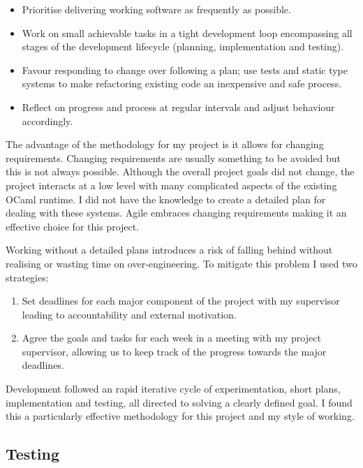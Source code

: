 \begin{itemize}
    \item Prioritise delivering working software as frequently as possible.
    \item Work on small achievable tasks in a tight development loop encompassing all stages of the
          development lifecycle (planning, implementation and testing).
    \item Favour responding to change over following a plan; use tests and static type systems to
          make refactoring existing code an inexpensive and safe process.
    \item Reflect on progress and process at regular intervals and adjust behaviour accordingly.
\end{itemize}

The advantage of the methodology for my project is it allows for changing requirements. Changing
requirements are  usually something to be avoided but this is not always possible.  Although the
overall project goals did not change, the project interacts at a low level with many complicated
aspects of the existing OCaml runtime. I did not have the knowledge to create a detailed plan for
dealing with these systems. Agile embraces changing requirements making it an effective choice for
this project.

Working without a detailed plans introduces a risk of falling behind without realising or wasting
time on over-engineering. To mitigate this problem I used two strategies:

\begin{enumerate}
    \item Set deadlines for each major component of the project with my supervisor leading to
          accountability and external motivation.
    \item Agree the goals and tasks for each week in a meeting with my project supervisor,
          allowing us to keep track of the progress towards the major deadlines.
\end{enumerate}

Development followed an rapid iterative cycle of experimentation, short plans, implementation and
testing, all directed to solving a clearly defined goal. I found this a particularly effective
methodology for this project and my style of working.

\subsection{Testing}

